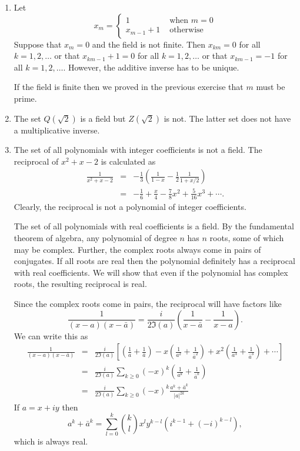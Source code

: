 \begin{enumerate}
\item Let
\[
x_m = \begin{cases}
1 & \text{ when } m = 0 \\
x_{m-1} + 1 & \text{ otherwise}
\end{cases}
\]
Suppose that $x_m = 0$ and the field is not finite. Then $x_{km} = 0$ for all
$k = 1, 2, \ldots$ or that $x_{km - 1} + 1 = 0$ for all $k = 1, 2, \ldots$ or
that $x_{km - 1} = -1$ for all $k = 1, 2, \ldots$. However, the additive
inverse has to be unique.

If the field is finite then we proved in the previous exercise that $m$ must
be prime.

\item The set $Q(\sqrt{2})$ is a field but $Z(\sqrt{2})$ is not. The latter
set does not have a multiplicative inverse.

\item The set of all polynomials with integer coefficients is not a field.
The reciprocal of $x^2 + x - 2$ is calculated as
\begin{eqnarray*}
\frac{1}{x^2+x-2} &=& -\frac{1}{3}\left(\frac{1}{1-x} - 
                      \frac{1}{2}\frac{1}{1+x/2}\right) \\
 &=& -\frac{1}{6} + \frac{x}{4} - \frac{7}{8}x^2 + \frac{5}{16}x^3 + \cdots.
\end{eqnarray*}
Clearly, the reciprocal is not a polynomial of integer coefficients.

The set of all polynomials with real coefficients is a field. By the 
fundamental theorem of algebra, any polynomial of degree $n$ has $n$ roots,
some of which may be complex. Further, the complex roots always come in pairs
of conjugates. If all roots are real then the polynomial definitely has a
reciprocal with real coefficients. We will show that even if the polynomial has
complex roots, the resulting reciprocal is real.

Since the complex roots come in pairs, the reciprocal will have factors like
\[
\frac{1}{(x - a)(x - \bar{a})} = \frac{i}{2\Im(a)}\left(\frac{1}{x - \bar{a}}
- \frac{1}{x - a}\right).
\]
We can write this as
\begin{eqnarray*}
\frac{1}{(x - a)(x - \bar{a})} &=& \frac{i}{2\Im(a)}\left[\left(\frac{1}{a} + 
\frac{1}{\bar{a}}\right) - x\left(\frac{1}{a^2} + \frac{1}{\bar{a}^2}\right) 
+ x^2\left(\frac{1}{a^3} + \frac{1}{\bar{a}^3}\right) + \cdots\right] \\
 &=& \frac{i}{2\Im(a)}\sum_{k \ge 0}(-x)^k
     \left(\frac{1}{a^k} + \frac{1}{\bar{a}^k}\right) \\
 &=& \frac{i}{2\Im(a)}\sum_{k \ge 0}(-x)^k\frac{a^k + \bar{a}^k}{|a|^{2k}}
\end{eqnarray*}
If $a = x + iy$ then
\[
a^k + \bar{a}^k = \sum_{l=0}^k\binom{k}{l}x^{l}y^{k-l}(i^{k-1} + (-i)^{k-l}),
\]
which is always real.


\end{enumerate}
